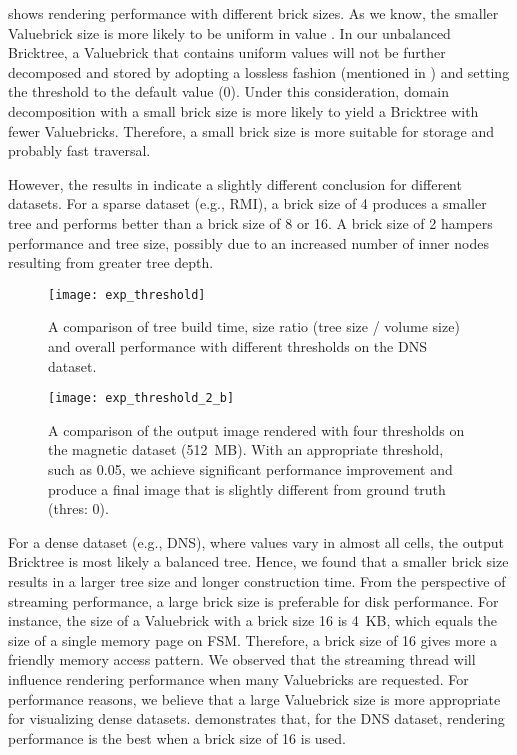  shows rendering performance with different brick sizes.
As we know, the smaller Valuebrick size is more likely to be uniform in value 
\cite{fogal2013analysis}. In our unbalanced Bricktree, a Valuebrick that contains
uniform values will not be further decomposed and stored by adopting a lossless 
fashion (mentioned in ) and setting the threshold 
to the default value (0). Under this consideration, domain decomposition with a 
small brick size is more likely to yield a Bricktree with fewer Valuebricks. 
Therefore, a small brick size is more suitable for storage and probably fast traversal. 

However, the results in  indicate a slightly
different conclusion for different datasets. For a sparse dataset (e.g., RMI),
a brick size of 4 produces a smaller tree and performs better than a brick size of 8 or 16.
A brick size of 2 hampers performance and tree size, possibly due to an increased number of
inner nodes resulting from greater tree depth. 

\begin{figure}[b]
    \centering
    \texttt{[image: exp\_threshold]}
    \vspace{-2em}
	\caption{\label{fig:exp_threshold}%
	A comparison of tree build time, size ratio (tree size / volume size) and overall performance with different thresholds on the DNS dataset.}
	\vspace{-0.5em}
\end{figure}

\begin{figure*}[t]
    \centering
    \texttt{[image: exp\_threshold\_2\_b]}
	\caption{\label{fig:exp_threshold_2}%
	A comparison of the output image rendered with four thresholds on the magnetic dataset (512~MB).
	With an appropriate threshold, such as 0.05, we achieve significant performance improvement and produce a final image that is slightly different from ground truth (thres: 0).
	}
\end{figure*}


For a dense dataset (e.g., DNS), where values vary in almost all cells,
the output Bricktree is most likely a balanced tree. Hence, we found that
a smaller brick size results in a larger tree size and longer construction time.
From the perspective of streaming performance, a large brick size is preferable 
for disk performance. For instance, the size of a Valuebrick with a
brick size 16 is 4~KB, which equals the size of a single memory page on FSM. 
Therefore, a brick size of 16 gives more a friendly memory access pattern. 
We observed that the streaming thread will influence rendering performance
when many Valuebricks are requested. For performance reasons, we believe that a 
large Valuebrick size is more appropriate for visualizing dense datasets. 
 demonstrates that, for the DNS dataset, rendering
performance is the best when a brick size of 16 is used. 

